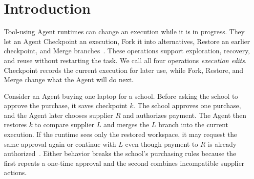 \section{Introduction}
\label{sec:introduction}

Tool-using Agent runtimes can change an execution while it is in progress.
They let an Agent Checkpoint an execution, Fork it into alternatives, Restore an earlier checkpoint, and Merge branches~\cite{codexappserver,claudesessions,claudecheckpoint,wang2026fork,wu2026crab,zhang2026agentlibos}.
These operations support exploration, recovery, and reuse without restarting the task.
We call all four operations \emph{execution edits}.
Checkpoint records the current execution for later use, while Fork, Restore, and Merge change what the Agent will do next.

Consider an Agent buying one laptop for a school.
Before asking the school to approve the purchase, it saves checkpoint \(k\).
The school approves one purchase, and the Agent later chooses supplier \(R\) and authorizes payment.
The Agent then restores \(k\) to compare supplier \(L\) and merges the \(L\) branch into the current execution.
If the runtime sees only the restored workspace, it may request the same approval again or continue with \(L\) even though payment to \(R\) is already authorized~\cite{zheng2026acrfence}.
Either behavior breaks the school's purchasing rules because the first repeats a one-time approval and the second combines incompatible supplier actions.

